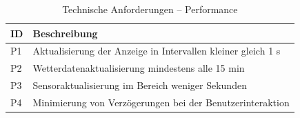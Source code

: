 \begin{table}[H]
\centering
\begin{tabular}{p{3cm} p{9cm}}
\textbf{ID} & \textbf{Beschreibung} \\
\hline
P1 & Aktualisierung der Anzeige in Intervallen kleiner gleich 1 s \\
P2 & Wetterdatenaktualisierung mindestens alle 15 min \\
P3 & Sensoraktualisierung im Bereich weniger Sekunden \\
P4 & Minimierung von Verzögerungen bei der Benutzerinteraktion \\
\end{tabular}
\caption{Technische Anforderungen – Performance}
\label{tab:Performance Anforderung}
\end{table}









